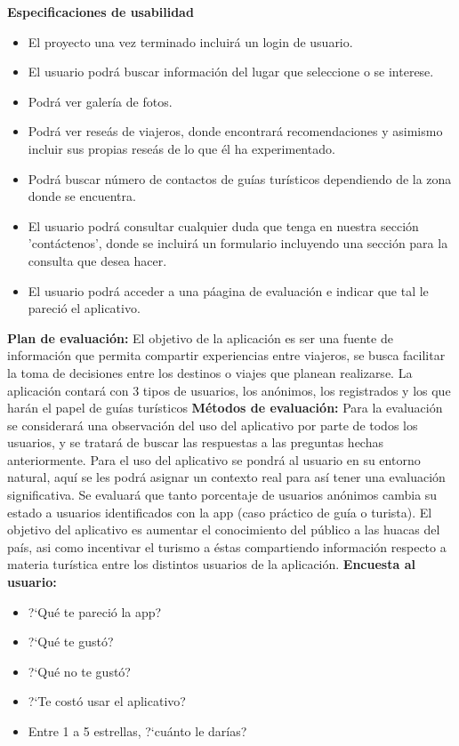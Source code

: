 \documentclass[12pt,a4paper]{report}
\begin{document}
\textbf{\Large \hspace{0.3cm} Especificaciones de usabilidad }
\begin{itemize}
\item El proyecto una vez terminado incluir\'a un login de usuario.
\item El usuario podr\'a buscar informaci\'on del lugar que seleccione o se interese.
\item Podr\'a ver galer\'ia de fotos.
\item Podr\'a ver rese\'as de viajeros, donde encontrar\'a recomendaciones y asimismo incluir sus propias rese\'as de lo que \'el ha experimentado.
\item Podr\'a buscar n\'umero de contactos de gu\'ias tur\'isticos dependiendo de la zona donde se encuentra.
\item El usuario podr\'a consultar cualquier duda que tenga en nuestra secci\'on 'cont\'actenos', donde se incluir\'a un formulario incluyendo una secci\'on para la consulta que desea hacer.
\item El usuario podr\'a acceder a una p\'aagina de evaluaci\'on e indicar que tal le pareci\'o el aplicativo.
\end{itemize}
\newpage
\hfill \break
\textbf{\Large \hspace{0.3cm} Plan de evaluaci\'on: }\hfill \break \hfill \break
El objetivo de la aplicaci\'on es ser una fuente de informaci\'on que permita compartir experiencias entre viajeros, se busca facilitar la toma de decisiones entre los destinos o viajes que planean realizarse.\newline
La aplicaci\'on contar\'a con 3 tipos de usuarios, los an\'onimos, los registrados y los que har\'an el papel de gu\'ias tur\'isticos
\hfill \break
\hfill \break
\textbf{\Large \hspace{0.3cm} M\'etodos de evaluaci\'on: }\hfill \break \hfill \break
Para la evaluaci\'on se considerar\'a una observaci\'on del uso del aplicativo por parte de todos los usuarios, y se tratar\'a de buscar las respuestas a las preguntas hechas anteriormente.
\hfill \break
Para el uso del aplicativo se pondr\'a al usuario en su entorno natural, aqu\'i se les podr\'a asignar un contexto real para as\'i tener una evaluaci\'on significativa.
\hfill \break
Se evaluar\'a que tanto porcentaje de usuarios an\'onimos cambia su estado a usuarios identificados con la app (caso pr\'actico de gu\'ia o turista).
\hfill \break
\hfill \break
El objetivo del aplicativo es aumentar el conocimiento del p\'ublico a las huacas del pa\'is, asi como incentivar el turismo a \'estas compartiendo informaci\'on respecto a materia tur\'istica entre los distintos usuarios de la aplicaci\'on.
\hfill \break
\hfill \break
\textbf{\Large \hspace{0.3cm} Encuesta al usuario: }\hfill \break
\begin{itemize}
\item ?`Qu\'e te pareci\'o la app?
\item ?`Qu\'e te gust\'o?
\item ?`Qu\'e no te gust\'o?
\item ?`Te cost\'o usar el aplicativo?
\item Entre 1 a 5 estrellas, ?`cu\'anto le dar\'ias?
\end{itemize}
\end{document}
